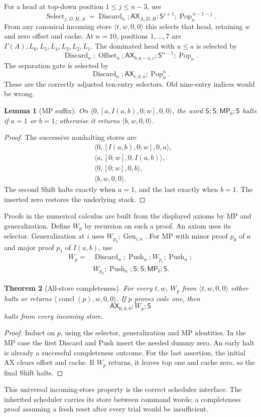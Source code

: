 \documentclass[11pt]{article}
\newtheorem{theorem}{Theorem}[section]
\newtheorem{lemma}[theorem]{Lemma}
\newcommand{\AX}{\mathsf{AX}}
\newcommand{\MP}{\mathsf{MP}}
\newcommand{\Shift}{\mathsf{S}}
\newcommand{\st}[4]{\langle #1,#2,#3,#4\rangle}
\newcommand{\Push}{\operatorname{Push}}
\newcommand{\Pop}{\operatorname{Pop}}
\newcommand{\Discard}{\operatorname{Discard}}
\newcommand{\Gen}{\operatorname{Gen}}
\begin{document}
For a head at top-down position $1\le j\le n-3$, use
\[
 \operatorname{Select}_{j,D,H,A}=
 \Discard_n;\AX_{A,D,H};\Shift^{j+1};\Pop_n^{\,n-1-j}.
\]
From any canonical incoming store $\st{t}{w}{0}{0}$ this selects that head, retaining $w$ and zero offset and cache. At $n=10$, positions $1,\ldots,7$ are $\Gamma(A),L_6,L_5,L_4,L_3,L_2,L_1$. The dominated head with $u\le a$ is selected by
\[
 \Discard_n;\operatorname{Offset}_u;\AX_{b,a-u,c};\Shift^{n-1};\Pop_n.
\]
The separation gate is selected by
\[
 \Discard_n;\AX_{c,b,a};\Pop_n^n.
\]
These are the correctly adjusted ten-entry selectors. Old nine-entry indices would be wrong.

\begin{lemma}[MP suffix]
On $\st{0}{[a,I(a,b),0;w]}{0}{0}$, the word
$\Shift;\Shift;\MP_b;\Shift$ halts if $a=1$ or $b=1$; otherwise it returns $\st{b}{w}{0}{0}$.
\end{lemma}
\begin{proof}
The successive nonhalting stores are
\begin{align*}
 &\st{0}{[I(a,b),0;w]}{0}{a},\\
 &\st{a}{[0;w]}{0}{I(a,b)},\\
 &\st{0}{[0;w]}{0}{b},\\
 &\st{b}{w}{0}{0}.
\end{align*}
The second Shift halts exactly when $a=1$, and the last exactly when $b=1$. The inserted zero restores the underlying stack.
\end{proof}

Proofs in the numerical calculus are built from the displayed axioms by MP and generalization. Define $W_p$ by recursion on such a proof. An axiom uses its selector. Generalization at $i$ uses $W_{p_0};\Gen_{i,n}$. For MP with minor proof $p_0$ of $a$ and major proof $p_1$ of $I(a,b)$, use
\begin{align*}
W_p={}&\Discard_n;\Push_n;W_{p_1};\Push_n;\\
     &W_{p_0};\Push_n;\Shift;\Shift;\MP_b;\Shift.
\end{align*}

\begin{theorem}[All-store completeness]
For every $t,w$, $W_p$ from $\st{t}{w}{0}{0}$ either halts or returns
$\st{\operatorname{concl}(p)}{w}{0}{0}$.
If $p$ proves code one, then
\[
 \AX_{0,0,0};W_p;\Shift
\]
halts from every incoming store.
\end{theorem}
\begin{proof}
Induct on $p$, using the selector, generalization and MP identities. In the MP case the first Discard and Push insert the needed dummy zero. An early halt is already a successful completeness outcome. For the last assertion, the initial AX clears offset and cache. If $W_p$ returns, it leaves top one and cache zero, so the final Shift halts.
\end{proof}
This universal incoming-store property is the correct scheduler interface. The inherited scheduler carries its store between command words; a completeness proof assuming a fresh reset after every trial would be insufficient.
\end{document}
